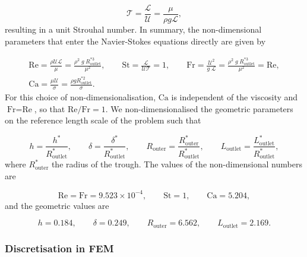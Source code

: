 \documentclass[aip,graphicx]{revtex4-1}
\newcommand{\sym}[1]{\text{#1}} \newcommand{\dif}{\mathrm{d}}
\begin{document}
\begin{equation}
 \mathcal{T} = \frac{\mathcal{L}}{\mathcal{U}} = \frac{\mu}{\rho g
   \mathcal{L}},
 \label{eqn:time_scale}
\end{equation}
resulting in a unit Strouhal number.  In summary, the non-dimensional
parameters that enter the Navier-Stokes equations directly are given
by

\begin{gather}
 \sym{Re} = \frac{\rho \mathcal{U L}}{\mu} = \frac{\rho^2 \; g \;
   R_{\sym{outlet}}^{*3}}{\mu^2}, \qquad \sym{St} =
 \frac{\mathcal{L}}{\mathcal{U} \mathcal{T}} = 1, \qquad \sym{Fr} =
 \frac{\mathcal{U}^2}{g \; \mathcal{L}} = \frac{\rho^2 \; g \;
   R_{\sym{outlet}}^{*3}}{\mu^2} = \sym{Re}, \nonumber \\[0.75cm]
 \sym{Ca} = \frac{\mu \mathcal{U}}{\sigma} = \frac{\rho g
   R_{\sym{outlet}}^{*2}}{\sigma}.
 \label{eqn:nondim_numbers}
\end{gather}
For this choice of non-dimensionalisation, $\sym{Ca}$ is independent
of the viscosity and $\sym{Fr}=\sym{Re}$, so that $\sym{Re}/\sym{Fr} =
1$.  We non-dimensionalised the geometric parameters on the reference
length scale of the problem such that

\begin{equation}
 h = \frac{h^*}{R_{\sym{outlet}}^*}, \qquad \delta =
 \frac{\delta^*}{R_{\sym{outlet}}^*}, \qquad R_{\sym{outer}} =
 \frac{R_{\sym{outer}}^*}{R_{\sym{outlet}}^*}, \qquad L_{\sym{outlet}}
 = \frac{L_{\sym{outlet}}^*}{R_{\sym{outlet}}^*},
\end{equation}
where $R_{\sym{outer}}^*$ the radius of the trough.  The values of the
non-dimensional numbers are

\begin{equation}
 \sym{Re} = \sym{Fr} = 9.523 \times 10^{-4}, \qquad \sym{St}=1, \qquad
 \sym{Ca}=5.204,
\end{equation}
and the geometric values are

\begin{equation}
 h = 0.184, \qquad \delta=0.249, \qquad R_{\sym{outer}}=6.562, \qquad
 L_{\sym{outlet}}=2.169.
\end{equation}

\subsubsection{Discretisation in FEM}
\end{document}
